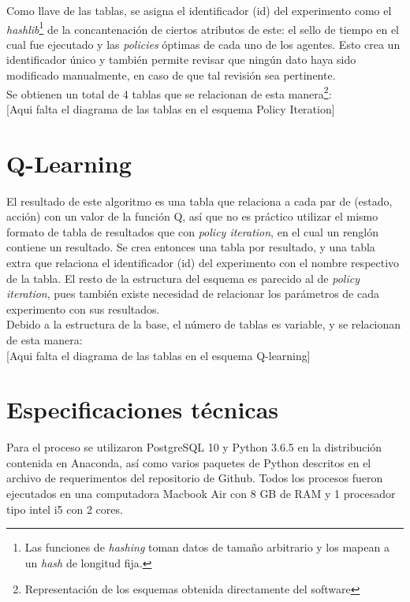 Como llave de las tablas, se asigna el identificador (id) del experimento como el \textit{hashlib}\footnote{Las funciones de \textit{hashing} toman datos de tama\~no arbitrario y los mapean a un \textit{hash} de longitud fija.} de la concantenaci\'on de ciertos atributos de este: el sello de tiempo en el cual fue ejecutado y las \textit{policies} \'optimas de cada uno de los agentes. Esto crea un identificador \'unico y tambi\'en permite revisar que ning\'un dato haya sido modificado manualmente, en caso de que tal revisi\'on sea pertinente.\\

Se obtienen un total de 4 tablas que se relacionan de esta manera\footnote{Representaci\'on de los esquemas obtenida directamente del software }:\\

[Aqui falta el diagrama de las tablas en el esquema Policy Iteration]




\section{Q-Learning}

El resultado de este algoritmo es una tabla que relaciona a cada par de (estado, acci\'on) con un valor de la funci\'on Q, as\'i que no es pr\'actico utilizar el mismo formato de tabla de resultados que con \textit{policy iteration}, en el cual un rengl\'on contiene un resultado. Se crea entonces una tabla por resultado, y una tabla extra que relaciona el identificador (id) del experimento con el nombre respectivo de la tabla. El resto de la estructura del esquema es parecido al de \textit{policy iteration}, pues tambi\'en existe necesidad de relacionar los par\'ametros de cada experimento con sus resultados.\\

Debido a la estructura de la base, el n\'umero de tablas es variable, y se relacionan de esta manera:\\ 

[Aqui falta el diagrama de las tablas en el esquema Q-learning]

\section{Especificaciones t\'ecnicas}

Para el proceso se utilizaron PostgreSQL 10 y Python 3.6.5 en la distribuci\'on contenida en Anaconda, as\'i como varios paquetes de Python descritos en el archivo de requerimentos del repositorio de Github. Todos los procesos fueron ejecutados en una computadora Macbook Air con 8 GB de RAM y 1 procesador tipo intel i5 con 2 cores.
